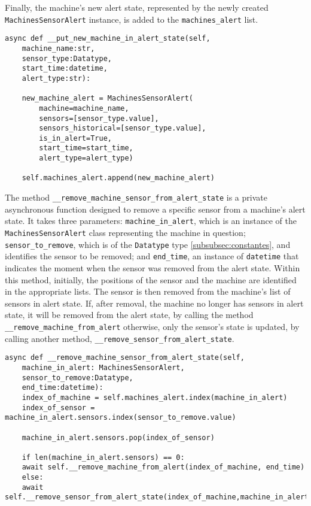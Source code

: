 Finally, the machine's new alert state, represented by the newly created \texttt{MachinesSensorAlert} instance, is added to the \texttt{machines\_alert} list.

\begin{verbatim}
async def __put_new_machine_in_alert_state(self,
    machine_name:str,
    sensor_type:Datatype,
    start_time:datetime,
    alert_type:str):

    new_machine_alert = MachinesSensorAlert(
        machine=machine_name,
        sensors=[sensor_type.value],
        sensors_historical=[sensor_type.value],
        is_in_alert=True,
        start_time=start_time,
        alert_type=alert_type)

    self.machines_alert.append(new_machine_alert)
\end{verbatim}

The method \texttt{\_\_remove\_machine\_sensor\_from\_alert\_state} is a private asynchronous function designed to remove a specific sensor from a machine's alert state. It takes three parameters: \texttt{machine\_in\_alert}, which is an instance of the \texttt{MachinesSensorAlert} class representing the machine in question; \texttt{sensor\_to\_remove}, which is of the \texttt{Datatype} type \ref{subsubsec:constantes}, and identifies the sensor to be removed; and \texttt{end\_time}, an instance of \texttt{datetime} that indicates the moment when the sensor was removed from the alert state. Within this method, initially, the positions of the sensor and the machine are identified in the appropriate lists. The sensor is then removed from the machine's list of sensors in alert state. If, after removal, the machine no longer has sensors in alert state, it will be removed from the alert state, by calling the method \texttt{\_\_remove\_machine\_from\_alert} otherwise, only the sensor's state is updated, by calling another method, \texttt{\_\_remove\_sensor\_from\_alert\_state}.

\begin{verbatim}
async def __remove_machine_sensor_from_alert_state(self,
    machine_in_alert: MachinesSensorAlert,
    sensor_to_remove:Datatype,
    end_time:datetime):
    index_of_machine = self.machines_alert.index(machine_in_alert)
    index_of_sensor = machine_in_alert.sensors.index(sensor_to_remove.value)
    
    machine_in_alert.sensors.pop(index_of_sensor)
    
    if len(machine_in_alert.sensors) == 0:
    await self.__remove_machine_from_alert(index_of_machine, end_time)
    else:
    await self.__remove_sensor_from_alert_state(index_of_machine,machine_in_alert)
    
\end{verbatim}

